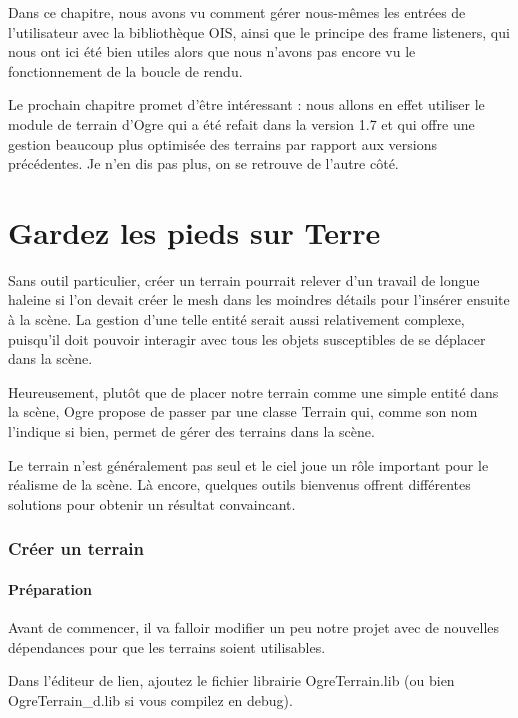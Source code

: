 \documentclass[10pt,a4paper]{report}
\begin{document}
Dans ce chapitre, nous avons vu comment g\'erer nous-m\^emes les entr\'ees de l'utilisateur avec la biblioth\`eque OIS, ainsi que le principe des frame listeners, qui nous ont ici \'et\'e bien utiles alors que nous n'avons pas encore vu le fonctionnement de la boucle de rendu.

Le prochain chapitre promet d'\^etre int\'eressant : nous allons en effet utiliser le module de terrain d'Ogre qui a \'et\'e refait dans la version 1.7 et qui offre une gestion beaucoup plus optimis\'ee des terrains par rapport aux versions pr\'ec\'edentes. Je n'en dis pas plus, on se retrouve de l'autre c\^ot\'e.




\part{Gardez les pieds sur Terre}
Sans outil particulier, cr\'eer un terrain pourrait relever d'un travail de longue haleine si l'on devait cr\'eer le mesh dans les moindres d\'etails pour l'ins\'erer ensuite \`a la sc\`ene. La gestion d'une telle entit\'e serait aussi relativement complexe, puisqu'il doit pouvoir interagir avec tous les objets susceptibles de se d\'eplacer dans la sc\`ene.

Heureusement, plut\^ot que de placer notre terrain comme une simple entit\'e dans la sc\`ene, Ogre propose de passer par une classe Terrain qui, comme son nom l'indique si bien, permet de g\'erer des terrains dans la sc\`ene.

Le terrain n'est g\'en\'eralement pas seul et le ciel joue un r\^ole important pour le r\'ealisme de la sc\`ene. L\`a encore, quelques outils bienvenus offrent diff\'erentes solutions pour obtenir un r\'esultat convaincant.



\section{Cr\'eer un terrain}


\subsection{Pr\'eparation}

Avant de commencer, il va falloir modifier un peu notre projet avec de nouvelles d\'ependances pour que les terrains soient utilisables.

Dans l'\'editeur de lien, ajoutez le fichier librairie OgreTerrain.lib (ou bien OgreTerrain\_d.lib si vous compilez en debug).
\end{document}
